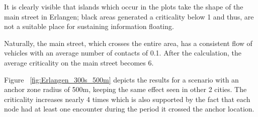 It is clearly visible that islands which occur in the plots take the shape of
the main street in Erlangen; black areas generated a criticality below 1 and
thus, are not a suitable place for sustaining information floating.

Naturally, the main street, which crosses the entire area, has a consistent flow
of vehicles with an average number of contacts of 0.1. After the calculation,
the average criticality on the main street becomes 6.

Figure ~\ref{fig:Erlangen_300s_500m} depicts the results for a scenario with an
anchor zone radius of 500m, keeping the same effect seen in other 2 cities. The
criticality increases nearly 4 times which is also supported by the fact that
each node had at least one encounter during the period it crossed the anchor
location.


